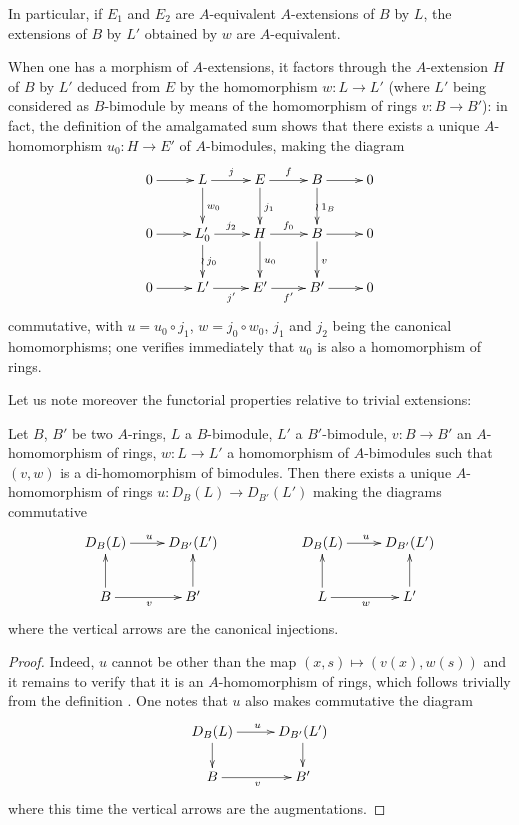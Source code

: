 \begin{env}[18.2.8]
In particular, if $E_1$ and $E_2$ are $A$-equivalent $A$-extensions of $B$ by $L$, the extensions of $B$ by $L'$ obtained by $w$ are $A$-equivalent.

When one has a morphism  of $A$-extensions, it factors through the $A$-extension $H$ of $B$ by $L'$ deduced from $E$ by the homomorphism $w:L\to L'$ (where $L'$ being considered as $B$-bimodule by means of the homomorphism of rings $v:B\to B'$):
in fact, the definition of the amalgamated sum shows that there exists a unique $A$-homomorphism $u_0:H\to E'$ of $A$-bimodules, making the diagram
\[
  \xymatrix{
    0\ar[r] & L\ar[r]^j\ar[d]^{w_0} & E\ar[r]^f\ar[d]^{j_1} & B\ar[r]\ar[d]^{1_B}\ar@{}[d]|{\wr} & 0\\
    0\ar[r] & L'_0\ar[r]^{j_2}\ar[d]^{j_0}\ar@{}[d]|{\wr} & H\ar[r]^{f_0}\ar[d]^{u_0} & B\ar[r]\ar[d]^v & 0\\
    0\ar[r] & L'\ar[r]_{j'} & E'\ar[r]_{f'} & B'\ar[r] & 0
  }
\]
commutative, with $u=u_0\circ j_1$, $w=j_0\circ w_0$, $j_1$ and $j_2$ being the canonical homomorphisms; one verifies immediately that $u_0$ is also a homomorphism of rings.

Let us note moreover the functorial properties relative to trivial extensions:
\end{env}

\begin{proposition}[18.2.9]
\label{0.18.2.9}
Let $B$, $B'$ be two $A$-rings, $L$ a $B$-bimodule, $L'$ a $B'$-bimodule, $v:B\to B'$ an $A$-homomorphism of rings, $w:L\to L'$ a homomorphism of $A$-bimodules such that $(v,w)$ is a di-homomorphism of bimodules.
Then there exists a unique $A$-homomorphism of rings $u:D_B(L)\to D_{B'}(L')$ making the diagrams commutative
\[
  \xymatrix{
    D_B(L)\ar[r]^u & D_{B'}(L') & & D_B(L)\ar[r]^u & D_{B'}(L')\\
    B\ar[u]\ar[r]_v & B'\ar[u] & & L\ar[u]\ar[r]_w & L'\ar[u]
  }
\]
where the vertical arrows are the canonical injections.
\end{proposition}


\begin{proof}
Indeed, $u$ cannot be other than the map $(x,s)\mapsto(v(x),w(s))$ and it remains to verify that it is an $A$-homomorphism of rings, which follows trivially from the definition .
One notes that $u$ also makes commutative the diagram
\[
  \xymatrix@C=2.2pc@R=1.5pc{
    D_B(L)\ar[r]^u\ar[d] & D_{B'}(L')\ar[d]\\
    B\ar[r]_v & B'
  }
\]
where this time the vertical arrows are the augmentations.
\end{proof}

